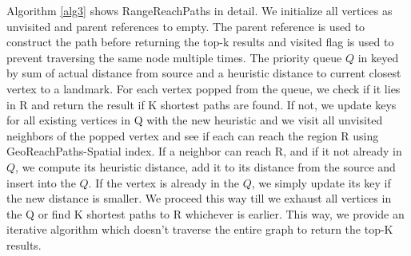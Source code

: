 {Algorithm \ref{alg3} shows RangeReachPaths in detail. We initialize all vertices as unvisited and parent references to empty. The parent reference is used to construct the path before returning the top-k results and visited flag is used to prevent traversing the same node multiple times. The priority queue $Q$ in keyed by sum of actual distance from source and a heuristic distance to current closest vertex to a landmark. For each vertex popped from the queue, we check if it lies in R and return the result if K shortest paths are found. If not, we update keys for all existing vertices in Q with the new heuristic and we visit all unvisited neighbors of the popped vertex and see if each can reach the region R using GeoReachPaths-Spatial index. If a neighbor can reach R, and if it not already in $Q$, we compute its heuristic distance, add it to its distance from the source and insert into the $Q$. If the vertex is already in the $Q$, we simply update its key if the new distance is smaller. We proceed this way till we exhaust all vertices in the Q or find K shortest paths to R whichever is earlier. This way, we provide an iterative algorithm which doesn't traverse the entire graph to return the top-K results.

		
		

}
